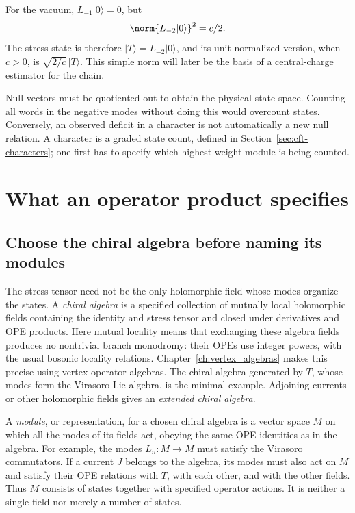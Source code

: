 For the vacuum, $L_{-1}|0\rangle=0$, but
\begin{equation}
 \norm{L_{-2}|0\rangle}^2=c/2.
 \label{eq:cft-stress-norm}
\end{equation}
The stress state is therefore $|T\rangle=L_{-2}|0\rangle$, and its
unit-normalized version, when $c>0$, is $\sqrt{2/c}\,|T\rangle$.
This simple norm
will later be the basis of a central-charge estimator for the chain.

Null vectors must be quotiented out to obtain the physical state space.
Counting all words in the negative modes without doing this would
overcount states. Conversely, an observed deficit in a character is
not automatically a new null relation. A character is a graded state
count, defined in Section~\ref{sec:cft-characters}; one first has to specify
which highest-weight module is being counted.

\section{What an operator product specifies}

\subsection{Choose the chiral algebra before naming its modules}
\label{sec:cft-chiral-modules}

The stress tensor need not be the only holomorphic field whose modes
organize the states. A \emph{chiral algebra} is a specified collection
of mutually local holomorphic fields containing the identity and
stress tensor and closed under derivatives and OPE products. Here
mutual locality means that exchanging these algebra fields produces
no nontrivial branch monodromy: their OPEs use integer powers, with
the usual bosonic locality relations. Chapter~\ref{ch:vertex_algebras} makes
this precise using vertex operator algebras. The chiral algebra
generated by $T$, whose modes form the Virasoro Lie algebra, is the
minimal example. Adjoining currents or other
holomorphic fields gives an \emph{extended chiral algebra}.

A \emph{module}, or representation, for a chosen chiral algebra is
a vector space $M$ on which all the modes of its fields act, obeying
the same OPE identities as in the algebra. For example, the modes
$L_n:M\to M$ must satisfy the Virasoro commutators. If a current
$J$ belongs to the algebra, its modes must also act on $M$ and
satisfy their OPE relations with $T$, with each other, and with the
other fields. Thus $M$ consists of states together with specified
operator actions. It is neither a single field nor merely a number
of states.


